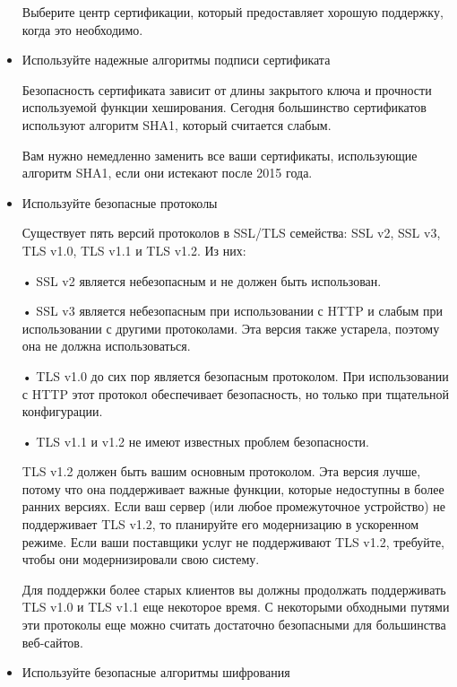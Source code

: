 \documentclass[11pt, a4paper]{article}		%
\begin{document}
\begin{itemize}
Выберите центр сертификации, который предоставляет хорошую поддержку, когда это необходимо.


\item Используйте надежные алгоритмы подписи сертификата

Безопасность сертификата зависит от длины закрытого ключа и прочности используемой функции хеширования. Сегодня большинство сертификатов используют алгоритм SHA1, который считается слабым. 

Вам нужно немедленно заменить все ваши сертификаты, использующие алгоритм SHA1, если они истекают после 2015 года.

\item Используйте безопасные протоколы

Существует пять версий протоколов в SSL/TLS семейства: SSL v2, SSL v3, TLS v1.0, TLS v1.1 и TLS v1.2. Из них:

• SSL v2 является небезопасным и не должен быть использован. 

• SSL v3 является небезопасным при использовании с HTTP и слабым при использовании с другими протоколами. Эта версия также устарела, поэтому она не должна использоваться.

• TLS v1.0 до сих пор является безопасным протоколом. При использовании с HTTP этот протокол обеспечивает безопасность, но только при тщательной конфигурации.

• TLS v1.1 и v1.2 не имеют известных проблем безопасности.

TLS v1.2 должен быть вашим основным протоколом. Эта версия лучше, потому что она поддерживает важные функции, которые недоступны в более ранних версиях. Если ваш сервер (или любое промежуточное устройство) не поддерживает TLS v1.2, то планируйте его модернизацию в ускоренном режиме. Если ваши поставщики услуг не поддерживают TLS v1.2, требуйте, чтобы они модернизировали свою систему.

Для поддержки более старых клиентов вы должны продолжать поддерживать TLS v1.0 и TLS v1.1 еще некоторое время. С некоторыми обходными путями эти протоколы еще можно считать достаточно безопасными для большинства веб-сайтов.

\item Используйте безопасные алгоритмы шифрования


\end{itemize}
\end{document}
